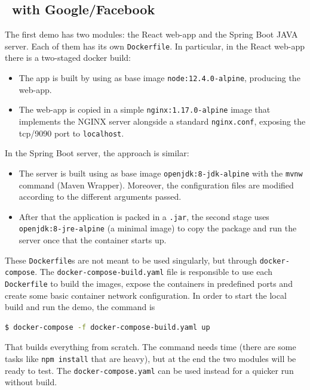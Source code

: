 \subsection{\oauth\ with Google/Facebook}
The first demo has two modules: the React web-app and the Spring Boot JAVA server. Each of them has its own \texttt{Dockerfile}. In particular, in the React web-app there is a two-staged docker build:

\begin{itemize}
    \item The app is built by using as base image \texttt{node:12.4.0-alpine}, producing the web-app.
    \item The web-app is copied in a simple \texttt{nginx:1.17.0-alpine} image that implements the NGINX server alongside a standard \texttt{nginx.conf}, exposing the tcp/9090 port to \texttt{localhost}.
\end{itemize}

\noindent In the Spring Boot server, the approach is similar:

\begin{itemize}
    \item The server is built using as base image \texttt{openjdk:8-jdk-alpine} with the \texttt{mvnw} command (Maven Wrapper). Moreover, the configuration files are modified according to the different arguments passed.
    \item After that the application is packed in a \texttt{.jar}, the second stage uses \texttt{openjdk:8-jre-alpine} (a minimal image) to copy the package and run the server once that the container starts up.
\end{itemize}

These \texttt{Dockerfile}s are not meant to be used singularly, but through \texttt{docker-compose}. The \texttt{docker-compose-build.yaml} file is responsible to use each \texttt{Dockerfile} to build the images, expose the containers in predefined ports and create some basic container network configuration. In order to start the local build and run the demo, the command is

\begin{lstlisting}[language=bash, basicstyle=\fontsize{12}{14}\ttfamily]
  $ docker-compose -f docker-compose-build.yaml up
\end{lstlisting}

\noindent That builds everything from scratch. The command needs time (there are some tasks like \texttt{npm install} that are heavy), but at the end the two modules will be ready to test. The \texttt{docker-compose.yaml} can be used instead for a 
quicker run without build.

